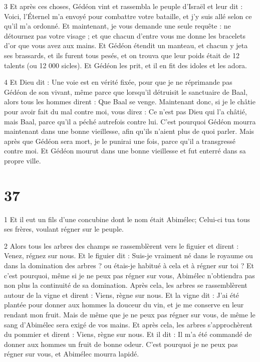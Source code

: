 \par 3 Et après ces choses, Gédéon vint et rassembla le peuple d'Israël et leur dit : Voici, l'Éternel m'a envoyé pour combattre votre bataille, et j'y suis allé selon ce qu'il m'a ordonné. Et maintenant, je vous demande une seule requête : ne détournez pas votre visage ; et que chacun d'entre vous me donne les bracelets d'or que vous avez aux mains. Et Gédéon étendit un manteau, et chacun y jeta ses brassards, et ils furent tous pesés, et on trouva que leur poids était de 12 talents (ou 12 000 sicles). Et Gédéon les prit, et il en fit des idoles et les adora.

\par 4 Et Dieu dit : Une voie est en vérité fixée, pour que je ne réprimande pas Gédéon de son vivant, même parce que lorsqu'il détruisit le sanctuaire de Baal, alors tous les hommes dirent : Que Baal se venge. Maintenant donc, si je le châtie pour avoir fait du mal contre moi, vous direz : Ce n'est pas Dieu qui l'a châtié, mais Baal, parce qu'il a péché autrefois contre lui. C'est pourquoi Gédéon mourra maintenant dans une bonne vieillesse, afin qu'ils n'aient plus de quoi parler. Mais après que Gédéon sera mort, je le punirai une fois, parce qu'il a transgressé contre moi. Et Gédéon mourut dans une bonne vieillesse et fut enterré dans sa propre ville.



\chapter{37}

\par 1 Et il eut un fils d'une concubine dont le nom était Abimélec; Celui-ci tua tous ses frères, voulant régner sur le peuple.

\par [Une feuille disparue.]

\par 2 Alors tous les arbres des champs se rassemblèrent vers le figuier et dirent : Venez, régnez sur nous. Et le figuier dit : Suis-je vraiment né dans le royaume ou dans la domination des arbres ? ou étais-je habitué à cela et à régner sur toi ? Et c'est pourquoi, même si je ne peux pas régner sur vous, Abimélec n'obtiendra pas non plus la continuité de sa domination. Après cela, les arbres se rassemblèrent autour de la vigne et dirent : Viens, règne sur nous. Et la vigne dit : J'ai été plantée pour donner aux hommes la douceur du vin, et je me conserve en leur rendant mon fruit. Mais de même que je ne peux pas régner sur vous, de même le sang d'Abimélec sera exigé de vos mains. Et après cela, les arbres s'approchèrent du pommier et dirent : Viens, règne sur nous. Et il dit : Il m'a été commandé de donner aux hommes un fruit de bonne odeur. C'est pourquoi je ne peux pas régner sur vous, et Abimélec mourra lapidé.

